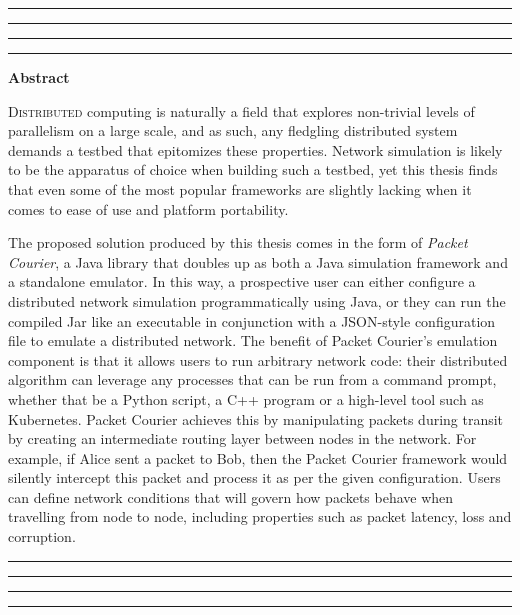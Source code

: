 \thispagestyle{empty}
\hrule\hrule\hrule\hrule
\begin{center}
    \textbf{\large Abstract}
    \\
\end{center}

\lettrine{D}{istributed} computing is naturally a field that explores non-trivial levels of parallelism on a large
scale, and as such, any fledgling distributed system demands a testbed that epitomizes these properties. Network
simulation is likely to be the apparatus of choice when building such a testbed, yet this thesis finds that even
some of the most popular frameworks are slightly lacking when it comes to ease of use and platform portability.

The proposed solution produced by this thesis comes in the form of \emph{Packet Courier}, a Java library that doubles
up as both a Java simulation framework and a standalone emulator. In this way, a prospective user can either
configure a distributed network simulation programmatically using Java, or they can run the compiled Jar like an
executable in conjunction with a JSON-style configuration file to emulate a distributed network. The benefit of
Packet Courier's emulation component is that it allows users to run arbitrary network code: their distributed
algorithm can leverage any processes that can be run from a command prompt, whether that be a Python script, a
C++ program or a high-level tool such as Kubernetes. Packet Courier achieves this by manipulating packets during
transit by creating an intermediate routing layer between nodes in the network. For example, if Alice sent a packet
to Bob, then the Packet Courier framework would silently intercept this packet and process it as per the given
configuration. Users can define network conditions that will govern how packets behave when travelling from node to
node, including properties such as packet latency, loss and corruption.


\vfill
\hrule\hrule\hrule\hrule
\clearpage
